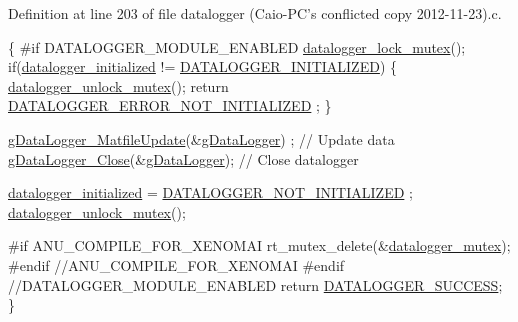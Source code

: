 Definition at line 203 of file datalogger (\-Caio-\/\-P\-C's conflicted copy 2012-\/11-\/23).\-c.


\begin{DoxyCode}
\{
\textcolor{preprocessor}{    #if DATALOGGER\_MODULE\_ENABLED}
\textcolor{preprocessor}{}        \hyperlink{datalogger_01_07Caio-PC's_01conflicted_01copy_012012-11-23_08_8c_a54b06d9395b2e370a5a72beb7f9524b2}{datalogger\_lock\_mutex}();
        \textcolor{keywordflow}{if}(\hyperlink{datalogger_01_07Caio-PC's_01conflicted_01copy_012012-11-23_08_8c_a35e8fbe04b90452afdc3c1be16ff6187}{datalogger\_initialized} != 
      \hyperlink{datalogger_01_07Caio-PC's_01conflicted_01copy_012012-11-23_08_8h_a684c343d340004b77ca2b782934c96ca}{DATALOGGER\_INITIALIZED})
    \{
            \hyperlink{datalogger_01_07Caio-PC's_01conflicted_01copy_012012-11-23_08_8c_a85453211c0c809083c36cc56b275aeeb}{datalogger\_unlock\_mutex}();
        \textcolor{keywordflow}{return} \hyperlink{datalogger_01_07Caio-PC's_01conflicted_01copy_012012-11-23_08_8h_a60df7fe0e61b757ad6a9db106b0eb43e}{DATALOGGER\_ERROR\_NOT\_INITIALIZED}
      ;
    \}

    \hyperlink{gdatalogger_8c_a05dc8ce832b941280d7de26057992640}{gDataLogger\_MatfileUpdate}(&\hyperlink{datalogger_01_07Caio-PC's_01conflicted_01copy_012012-11-23_08_8c_abe3b9c2c4e21e79c7b046b5986d13acc}{gDataLogger})
      ; \textcolor{comment}{// Update data}
    \hyperlink{gdatalogger_8c_a0ac95f84c6ee484c4ad0351530f1c468}{gDataLogger\_Close}(&\hyperlink{datalogger_01_07Caio-PC's_01conflicted_01copy_012012-11-23_08_8c_abe3b9c2c4e21e79c7b046b5986d13acc}{gDataLogger}); \textcolor{comment}{// Close
       datalogger}

    \hyperlink{datalogger_01_07Caio-PC's_01conflicted_01copy_012012-11-23_08_8c_a35e8fbe04b90452afdc3c1be16ff6187}{datalogger\_initialized} = \hyperlink{datalogger_01_07Caio-PC's_01conflicted_01copy_012012-11-23_08_8h_a4602a65fdfa920dfe832cfa50b7ee4c8}{DATALOGGER\_NOT\_INITIALIZED}
      ;
    \hyperlink{datalogger_01_07Caio-PC's_01conflicted_01copy_012012-11-23_08_8c_a85453211c0c809083c36cc56b275aeeb}{datalogger\_unlock\_mutex}();

\textcolor{preprocessor}{        #if ANU\_COMPILE\_FOR\_XENOMAI}
\textcolor{preprocessor}{}    rt\_mutex\_delete(&\hyperlink{datalogger_01_07Caio-PC's_01conflicted_01copy_012012-11-23_08_8c_a824d6f7fd1d3898ba0b1100ba37875c6}{datalogger\_mutex});
\textcolor{preprocessor}{        #endif  //ANU\_COMPILE\_FOR\_XENOMAI}
\textcolor{preprocessor}{}
\textcolor{preprocessor}{    #endif //DATALOGGER\_MODULE\_ENABLED}
\textcolor{preprocessor}{}
    \textcolor{keywordflow}{return} \hyperlink{datalogger_01_07Caio-PC's_01conflicted_01copy_012012-11-23_08_8h_abddebaf71d26d40183fccbb1a766b983}{DATALOGGER\_SUCCESS};
\}
\end{DoxyCode}

